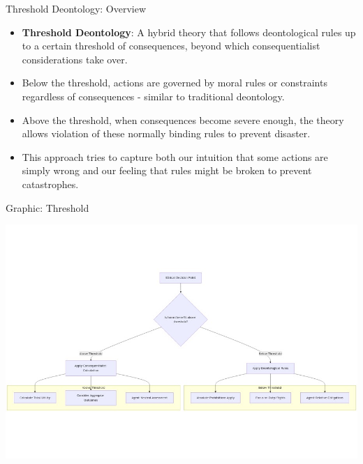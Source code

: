 \documentclass{beamer}
\begin{document}
\begin{frame}{Threshold Deontology: Overview}
\begin{itemize}
    \item \textbf{Threshold Deontology}: A hybrid theory that follows deontological rules up to a certain threshold of consequences, beyond which consequentialist considerations take over.
    
    \item Below the threshold, actions are governed by moral rules or constraints regardless of consequences - similar to traditional deontology.
    
    \item Above the threshold, when consequences become severe enough, the theory allows violation of these normally binding rules to prevent disaster.
    
    \item This approach tries to capture both our intuition that some actions are simply wrong and our feeling that rules might be broken to prevent catastrophes.
\end{itemize}
\end{frame}

\begin{frame}{Graphic: Threshold}
    
    \includegraphics[scale=.35]{threshold.png}
    
    \end{frame}
\end{document}
